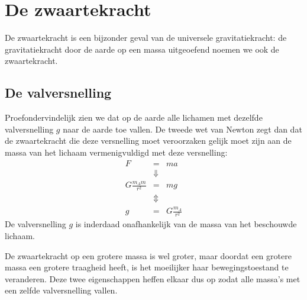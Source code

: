 \documentclass{ximera}
\begin{document}
	\author{Bart Lambregs}
    \xmsource





	\section{De zwaartekracht}
	De zwaartekracht is een bijzonder geval van de universele gravitatiekracht: de gravitatiekracht door de aarde op een massa uitgeoefend noemen we ook de zwaartekracht.
	
	\subsection{De valversnelling}
	
	Proefondervindelijk zien we dat op de aarde alle lichamen met
	dezelfde valversnelling $g$ naar de aarde toe vallen. De tweede wet
	van Newton zegt dan dat de zwaartekracht die deze versnelling moet
	veroorzaken gelijk moet zijn aan de massa van het lichaam
	vermenigvuldigd met deze versnelling:
	\begin{eqnarray}
	F&=&ma\nonumber\\
	&\Downarrow&\nonumber\\
	G\frac{m_Am}{r^2}&=&mg\nonumber\\
	&\Updownarrow&\nonumber\\
	g&=&G\frac{m_A}{r^2}
	\end{eqnarray}
	De valversnelling $g$ is inderdaad onafhankelijk van de massa van
	het be\-schouw\-de lichaam.
	
	De zwaartekracht op een grotere massa is wel groter, maar doordat
	een grotere massa een grotere traagheid heeft, is het moeilijker haar
	bewegingstoestand te veranderen. Deze twee eigenschappen heffen
	elkaar dus op zodat alle massa's met een zelfde valversnelling vallen.
	
	
	
	
	
\end{document}
